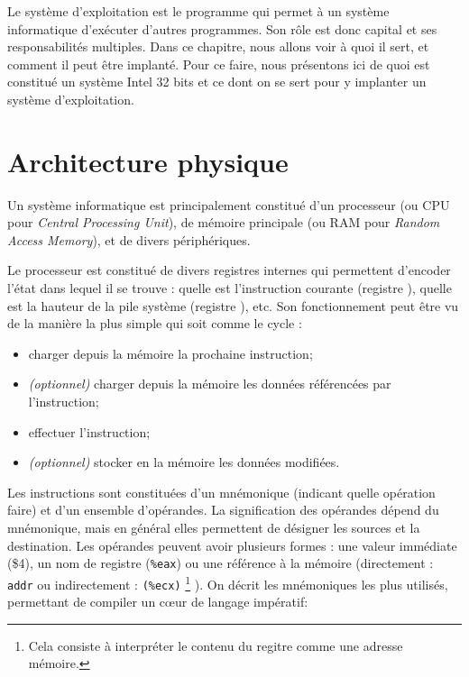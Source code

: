 Le système d'exploitation est le programme qui permet à un système informatique
d'exécuter d'autres programmes. Son rôle est donc capital et ses responsabilités
multiples. Dans ce chapitre, nous allons voir à quoi il sert, et comment il peut
être implanté. Pour ce faire, nous présentons ici de quoi est constitué un
système Intel 32 bits et ce dont on se sert pour y implanter un système
d'exploitation.

\section{Architecture physique}

Un système informatique est principalement constitué d'un processeur (ou CPU
pour \emph{Central Processing Unit}), de mémoire principale (ou RAM pour
\emph{Random Access Memory}), et de divers périphériques.

Le processeur est constitué de divers registres internes qui permettent
d'encoder l'état dans lequel il se trouve : quelle est l'instruction courante
(registre \eip), quelle est la hauteur de la pile système (registre \esp), etc.
Son fonctionnement peut être vu de la manière la plus simple qui soit comme le
cycle :

\begin{itemize}
\item
  charger depuis la mémoire la prochaine instruction;
\item
  \emph{(optionnel)} charger depuis la mémoire les données référencées
  par l'instruction;
\item
  effectuer l'instruction;
\item
  \emph{(optionnel)} stocker en la mémoire les données modifiées.
\end{itemize}

Les instructions sont constituées d'un mnémonique (indicant quelle opération
faire) et d'un ensemble d'opérandes. La signification des opérandes dépend du
mnémonique, mais en général elles permettent de désigner les sources et la
destination. Les opérandes peuvent avoir plusieurs formes : une valeur
immédiate (\$4), un nom de registre (\texttt{\%eax}) ou une référence à la
mémoire (directement : \texttt{addr} ou indirectement : \texttt{(\%ecx)}
\footnote{
  Cela consiste à interpréter le contenu du regitre \ecx comme une adresse
  mémoire.
}
). On décrit les mnémoniques les plus utilisés, permettant de compiler un cœur
de langage impératif:

